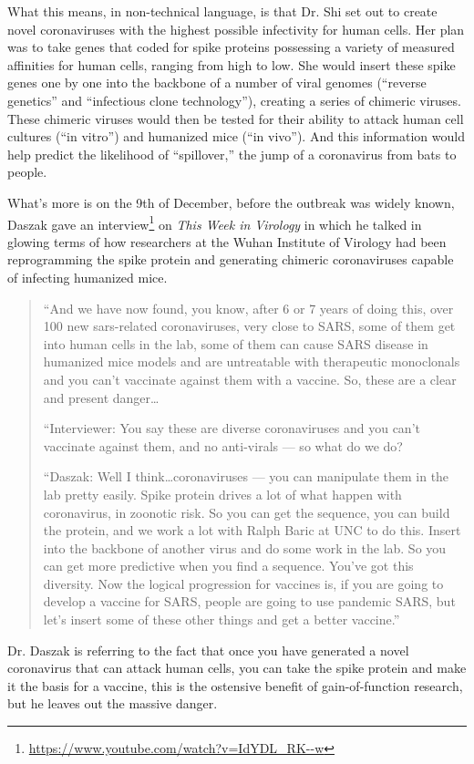\documentclass[11pt]{article}
\begin{document}
What this means, in non-technical language, is that Dr. Shi set out to create novel coronaviruses with the highest possible infectivity for human cells. Her plan was to take genes that coded for spike proteins possessing a variety of measured affinities for human cells, ranging from high to low. She would insert these spike genes one by one into the backbone of a number of viral genomes (“reverse genetics” and “infectious clone technology”), creating a series of chimeric viruses. These chimeric viruses would then be tested for their ability to attack human cell cultures (“in vitro”) and humanized mice (“in vivo”). And this information would help predict the likelihood of “spillover,” the jump of a coronavirus from bats to people.

What's more is on the 9th of December, before the outbreak was widely known, Daszak gave an interview\footnote{\url{https://www.youtube.com/watch?v=IdYDL\_RK--w}} on \emph{This Week in Virology} in which he talked in glowing terms of how researchers at the Wuhan Institute of Virology had been reprogramming the spike protein and generating chimeric coronaviruses capable of infecting humanized mice.

\begin{quote}
“And we have now found, you know, after 6 or 7 years of doing this, over 100 new sars-related coronaviruses, very close to SARS, some of them get into human cells in the lab, some of them can cause SARS disease in humanized mice models and are untreatable with therapeutic monoclonals and you can’t vaccinate against them with a vaccine. So, these are a clear and present danger…

“Interviewer: You say these are diverse coronaviruses and you can’t vaccinate against them, and no anti-virals — so what do we do?

“Daszak: Well I think…coronaviruses — you can manipulate them in the lab pretty easily. Spike protein drives a lot of what happen with coronavirus, in zoonotic risk. So you can get the sequence, you can build the protein, and we work a lot with Ralph Baric at UNC to do this. Insert into the backbone of another virus and do some work in the lab. So you can get more predictive when you find a sequence. You’ve got this diversity. Now the logical progression for vaccines is, if you are going to develop a vaccine for SARS, people are going to use pandemic SARS, but let’s insert some of these other things and get a better vaccine.”
\end{quote}

Dr. Daszak is referring to the fact that once you have generated a novel coronavirus that can attack human cells, you can take the spike protein and make it the basis for a vaccine, this is the ostensive benefit of gain-of-function research, but he leaves out the massive danger.
\end{document}
